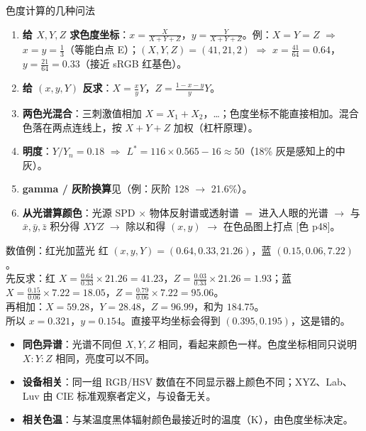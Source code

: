 \begin{recipe}{色度计算的几种问法}
\begin{enumerate}
\item \textbf{给 $X,Y,Z$ 求色度坐标}：$x=\frac{X}{X+Y+Z}$，$y=\frac{Y}{X+Y+Z}$。例：$X=Y=Z$ $\Rightarrow$ $x=y=\frac13$（等能白点 E）；$(X,Y,Z)=(41,21,2)$ $\Rightarrow$ $x=\frac{41}{64}=0.64$，$y=\frac{21}{64}=0.33$（接近 sRGB 红基色）。
\item \textbf{给 $(x,y,Y)$ 反求}：$X=\frac{x}{y}Y$，$Z=\frac{1-x-y}{y}Y$。
\item \textbf{两色光混合}：三刺激值相加 $X=X_1+X_2$，\dots；色度坐标不能直接相加。混合色落在两点连线上，按 $X+Y+Z$ 加权（杠杆原理）。
\item \textbf{明度}：$Y/Y_n=0.18$ $\Rightarrow$ $L^*=116\times0.565-16\approx50$（18\% 灰是感知上的中灰）。
\item \textbf{gamma / 灰阶换算}见\pageref{sec:gamma}（例：灰阶 128 $\to$ 21.6\%）。
\item \textbf{从光谱算颜色}：光源 SPD $\times$ 物体反射谱或透射谱 $=$ 进入人眼的光谱 $\to$ 与 $\bar x,\bar y,\bar z$ 积分得 $XYZ$ $\to$ 除以和得 $(x,y)$ $\to$ 在色品图上打点 [色 p48]。
\end{enumerate}
\end{recipe}

\begin{exam}{数值例：红光加蓝光}
红 $(x,y,Y)=(0.64,0.33,21.26)$，蓝 $(0.15,0.06,7.22)$。\\
先反求：红 $X=\frac{0.64}{0.33}\times21.26=41.23$，$Z=\frac{0.03}{0.33}\times21.26=1.93$；蓝 $X=\frac{0.15}{0.06}\times7.22=18.05$，$Z=\frac{0.79}{0.06}\times7.22=95.06$。\\
再相加：$X=59.28$，$Y=28.48$，$Z=96.99$，和为 $184.75$。\\
所以 $x=0.321$，$y=0.154$。直接平均坐标会得到 $(0.395,0.195)$，这是错的。
\end{exam}

\begin{warn}[易混概念]
\begin{itemize}
\item \textbf{同色异谱}：光谱不同但 $X,Y,Z$ 相同，看起来颜色一样。色度坐标相同只说明 $X:Y:Z$ 相同，亮度可以不同。
\item \textbf{设备相关}：同一组 RGB/HSV 数值在不同显示器上颜色不同；XYZ、Lab、Luv 由 CIE 标准观察者定义，与设备无关。
\item \textbf{相关色温}：与某温度黑体辐射颜色最接近时的温度（K），由色度坐标决定。
\end{itemize}
\end{warn}

